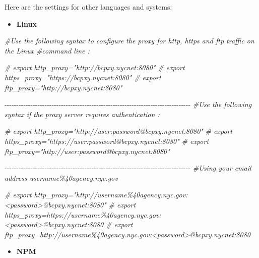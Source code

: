 \documentclass[
]{book}
\newenvironment{Shaded}{\begin{snugshade}}{\end{snugshade}}
\newcommand{\CommentTok}[1]{\textcolor[rgb]{0.56,0.35,0.01}{\textit{#1}}}
\newcommand{\SpecialCharTok}[1]{\textcolor[rgb]{0.00,0.00,0.00}{#1}}
\providecommand{\tightlist}{%
  \setlength{\itemsep}{0pt}\setlength{\parskip}{0pt}}
\begin{document}
Here are the settings for other languages and systems:

\begin{itemize}
\tightlist
\item
  \textbf{Linux}
\end{itemize}

\begin{Shaded}
\begin{Highlighting}[]
\CommentTok{\#Use the following syntax to configure the proxy for http, https and ftp traffic on the Linux }
\CommentTok{\#command line :}

\CommentTok{\# export http\_proxy="http://bcpxy.nycnet:8080"}
\CommentTok{\# export https\_proxy="https://bcpxy.nycnet:8080"}
\CommentTok{\# export ftp\_proxy="http://bcpxy.nycnet:8080"}

\SpecialCharTok{{-}{-}{-}{-}{-}{-}{-}{-}{-}{-}{-}{-}{-}{-}{-}{-}{-}{-}{-}{-}{-}{-}{-}{-}{-}{-}{-}{-}{-}{-}{-}{-}{-}{-}{-}{-}{-}{-}{-}{-}{-}{-}{-}{-}{-}{-}{-}{-}{-}{-}{-}{-}{-}{-}{-}{-}{-}{-}{-}{-}{-}{-}{-}{-}{-}{-}{-}{-}{-}{-}{-}{-}{-}{-}{-}{-}{-}{-}{-}}
\CommentTok{\#Use the following syntax if the proxy server requires authentication :}

\CommentTok{\# export http\_proxy="http://user:password@bcpxy.nycnet:8080"}
\CommentTok{\# export https\_proxy="https://user:password@bcpxy.nycnet:8080"}
\CommentTok{\# export ftp\_proxy="http://user:password@bcpxy.nycnet:8080"}

\SpecialCharTok{{-}{-}{-}{-}{-}{-}{-}{-}{-}{-}{-}{-}{-}{-}{-}{-}{-}{-}{-}{-}{-}{-}{-}{-}{-}{-}{-}{-}{-}{-}{-}{-}{-}{-}{-}{-}{-}{-}{-}{-}{-}{-}{-}{-}{-}{-}{-}{-}{-}{-}{-}{-}{-}{-}{-}{-}{-}{-}{-}{-}{-}{-}{-}{-}{-}{-}{-}{-}{-}{-}{-}{-}{-}{-}{-}{-}{-}{-}{-}}
\CommentTok{\#Using your email address username\%40agency.nyc.gov}

\CommentTok{\# export http\_proxy="http://username\%40agency.nyc.gov:\textless{}password\textgreater{}@bcpxy.nycnet:8080"}
\CommentTok{\# export https\_proxy=https://username\%40agency.nyc.gov:\textless{}password\textgreater{}@bcpxy.nycnet:8080}
\CommentTok{\# export ftp\_proxy=http://username\%40agency.nyc.gov:\textless{}password\textgreater{}@bcpxy.nycnet:8080}
\end{Highlighting}
\end{Shaded}

\begin{itemize}
\tightlist
\item
  \textbf{NPM}
\end{itemize}
\end{document}
